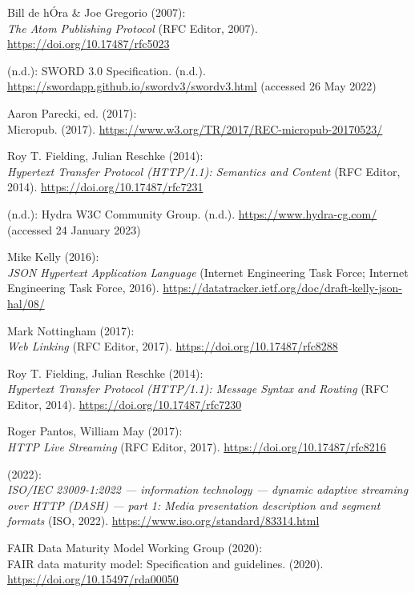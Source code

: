\begin{thebibliography}{9}
Bill de hÓra \& Joe Gregorio (2007): \\
\emph{The {Atom Publishing Protocol}} ({RFC Editor}, 2007).
\url{https://doi.org/10.17487/rfc5023}

(n.d.): {SWORD} 3.0 {Specification}. (n.d.).
\url{https://swordapp.github.io/swordv3/swordv3.html} (accessed 26 May
2022)

Aaron Parecki, ed. (2017): \\
Micropub. (2017).
\url{https://www.w3.org/TR/2017/REC-micropub-20170523/}

Roy T. Fielding, Julian Reschke (2014): \\
\emph{Hypertext {Transfer Protocol} ({HTTP}/1.1): {Semantics} and {Content}} ({RFC Editor}, 2014).
\url{https://doi.org/10.17487/rfc7231}

(n.d.): Hydra {W3C Community Group}. (n.d.).
\url{https://www.hydra-cg.com/} (accessed 24 January 2023)

Mike Kelly (2016): \\
\emph{{JSON Hypertext Application Language}}
(Internet Engineering Task Force; Internet Engineering Task Force,
2016). \url{https://datatracker.ietf.org/doc/draft-kelly-json-hal/08/}

Mark Nottingham (2017): \\
\emph{Web {Linking}} ({RFC Editor}, 2017).
\url{https://doi.org/10.17487/rfc8288}

Roy T. Fielding, Julian Reschke (2014): \\
\emph{Hypertext {Transfer
Protocol} ({HTTP}/1.1): {Message Syntax} and {Routing}} ({RFC Editor},
2014).
\url{https://doi.org/10.17487/rfc7230}

Roger Pantos, William May (2017): \\
\emph{{HTTP Live Streaming}} ({RFC
Editor}, 2017).
\url{https://doi.org/10.17487/rfc8216}

(2022): \\
\emph{{ISO}/{IEC} 23009-1:2022 --- information technology ---
dynamic adaptive streaming over HTTP (DASH) --- part 1: Media
presentation description and segment formats} ({ISO}, 2022).
\url{https://www.iso.org/standard/83314.html}

FAIR Data Maturity Model Working Group (2020): \\
{FAIR} data maturity
model: {Specification} and guidelines. (2020).
\url{https://doi.org/10.15497/rda00050}


\end{thebibliography}
